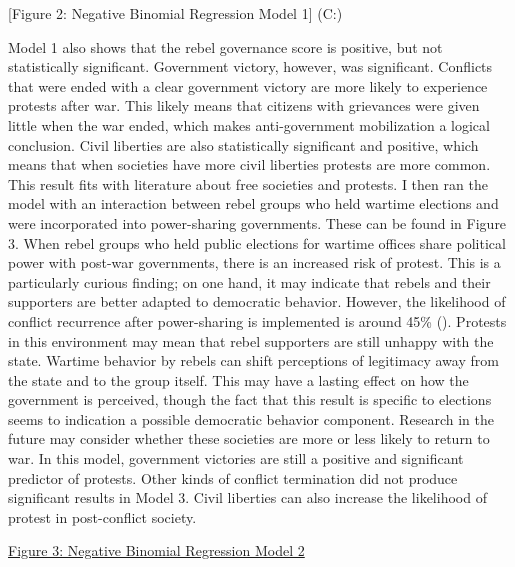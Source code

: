 \documentclass[11pt,]{article}
\begin{document}
{[}Figure 2: Negative Binomial Regression Model 1{]}
(C:\Users\Megan\Documents\CMPSPaper{})

Model 1 also shows that the rebel governance score is positive, but not
statistically significant. Government victory, however, was significant.
Conflicts that were ended with a clear government victory are more
likely to experience protests after war. This likely means that citizens
with grievances were given little when the war ended, which makes
anti-government mobilization a logical conclusion. Civil liberties are
also statistically significant and positive, which means that when
societies have more civil liberties protests are more common. This
result fits with literature about free societies and protests. I then
ran the model with an interaction between rebel groups who held wartime
elections and were incorporated into power-sharing governments. These
can be found in Figure 3. When rebel groups who held public elections
for wartime offices share political power with post-war governments,
there is an increased risk of protest. This is a particularly curious
finding; on one hand, it may indicate that rebels and their supporters
are better adapted to democratic behavior. However, the likelihood of
conflict recurrence after power-sharing is implemented is around 45\%
(\citet{hartzell_institutionalizing_2008}). Protests in this environment
may mean that rebel supporters are still unhappy with the state. Wartime
behavior by rebels can shift perceptions of legitimacy away from the
state and to the group itself. This may have a lasting effect on how the
government is perceived, though the fact that this result is specific to
elections seems to indication a possible democratic behavior component.
Research in the future may consider whether these societies are more or
less likely to return to war. In this model, government victories are
still a positive and significant predictor of protests. Other kinds of
conflict termination did not produce significant results in Model 3.
Civil liberties can also increase the likelihood of protest in
post-conflict society.

\href{C:/Users/Megan/Documents/CMPSPaper/Figure3}{Figure 3: Negative
Binomial Regression Model 2}
\end{document}
